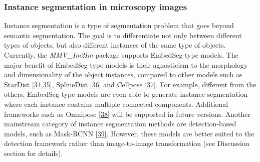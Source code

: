 \hypertarget{instance-segmentation-in-microscopy-images}{%
\subsubsection{Instance segmentation in microscopy images}\label{instance-segmentation-in-microscopy-images}}

Instance segmentation is a type of segmentation problem that goes beyond semantic segmentation. The goal is to differentiate not only between different types of objects, but also different instances of the same type of objects. Currently, the \emph{MMV\_Im2Im} package supports EmbedSeg-type models. The major benefit of EmbedSeg-type models is their agnosticism to the morphology and dimensionality of the object instances, compared to other models such as StarDist {[}\protect\hyperlink{ref-tIIG2f8K}{34},\protect\hyperlink{ref-14h90Vfg0}{35}{]}, SplineDist {[}\protect\hyperlink{ref-17Yrl6WGQ}{36}{]} and Cellpose {[}\protect\hyperlink{ref-TugPkOLy}{37}{]}. For example, different from the others, EmbedSeg-type models are even able to generate instance segmentation where each instance contains multiple connected components. Additional frameworks such as Omnipose {[}\protect\hyperlink{ref-lXzmjM5n}{38}{]} will be supported in future versions. Another mainstream category of instance segmentation methods are detection-based models, such as Mask-RCNN {[}\protect\hyperlink{ref-xi8wnibR}{39}{]}. However, these models are better suited to the detection framework rather than image-to-image transformation (see Discussion section for details).

